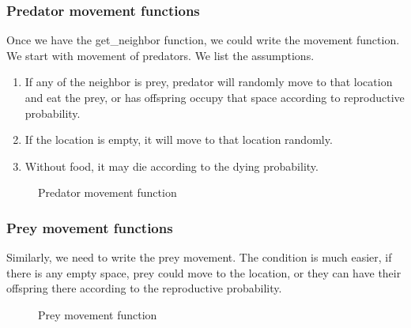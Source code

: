 \documentclass{article}
\begin{document}
\begin{normalsize}
\subsubsection{Predator movement functions}
Once we have the get\_neighbor function, we could write the movement function. We start with movement of predators. We list the assumptions.
\begin{enumerate}
	\item If any of the neighbor is prey, predator will randomly move to that location and eat the prey, or has offspring occupy that space according to reproductive probability.
	\item If the location is empty, it will move to that location randomly.
	\item Without food, it may die according to the dying probability.
\end{enumerate}
\begin{figure}[H]
	\caption{Predator movement function}
\end{figure}

\subsubsection{Prey movement functions}
Similarly, we need to write the prey movement. The condition is much easier, if there is any empty space, prey could move to the location, or they can have their offspring there according to the reproductive probability.
\begin{figure}[H]
	\caption{Prey movement function}
\end{figure}


\end{normalsize}
\end{document}
